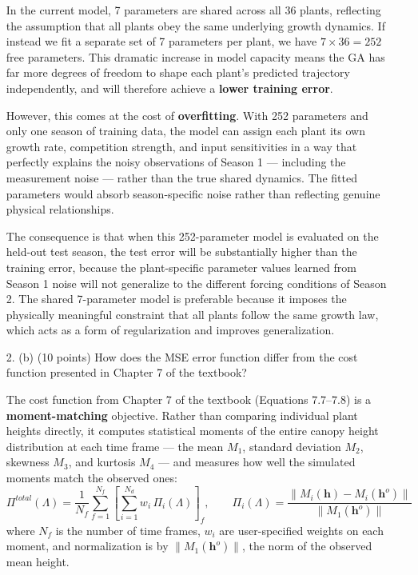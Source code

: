 \documentclass{article}
\begin{document}
\begin{enumerate}
\begin{answer}
In the current model, 7 parameters are shared across all 36 plants, reflecting the assumption that all plants obey the same underlying growth dynamics. If instead we fit a separate set of 7 parameters per plant, we have $7 \times 36 = 252$ free parameters. This dramatic increase in model capacity means the GA has far more degrees of freedom to shape each plant's predicted trajectory independently, and will therefore achieve a \textbf{lower training error}.

However, this comes at the cost of \textbf{overfitting}. With 252 parameters and only one season of training data, the model can assign each plant its own growth rate, competition strength, and input sensitivities in a way that perfectly explains the noisy observations of Season 1 — including the measurement noise — rather than the true shared dynamics. The fitted parameters would absorb season-specific noise rather than reflecting genuine physical relationships.

The consequence is that when this 252-parameter model is evaluated on the held-out test season, the test error will be substantially higher than the training error, because the plant-specific parameter values learned from Season 1 noise will not generalize to the different forcing conditions of Season 2. The shared 7-parameter model is preferable because it imposes the physically meaningful constraint that all plants follow the same growth law, which acts as a form of regularization and improves generalization.
\end{answer}
\newpage
\item[2. (b)] (10 points) How does the MSE error function differ from the cost function presented in Chapter 7 of the textbook?

\begin{answer}
The cost function from Chapter 7 of the textbook (Equations 7.7--7.8) is a \textbf{moment-matching} objective. Rather than comparing individual plant heights directly, it computes statistical moments of the entire canopy height distribution at each time frame --- the mean $M_1$, standard deviation $M_2$, skewness $M_3$, and kurtosis $M_4$ --- and measures how well the simulated moments match the observed ones:
\[
\Pi^{total}(\Lambda) = \frac{1}{N_f} \sum_{f=1}^{N_f} \left[ \sum_{i=1}^{N_d} w_i \, \Pi_i(\Lambda) \right]_f, \qquad \Pi_i(\Lambda) = \frac{\| M_i(\mathbf{h}) - M_i(\mathbf{h}^o) \|}{\| M_1(\mathbf{h}^o) \|}
\]
where $N_f$ is the number of time frames, $w_i$ are user-specified weights on each moment, and normalization is by $\|M_1(\mathbf{h}^o)\|$, the norm of the observed mean height.


\end{answer}
\end{enumerate}
\end{document}
